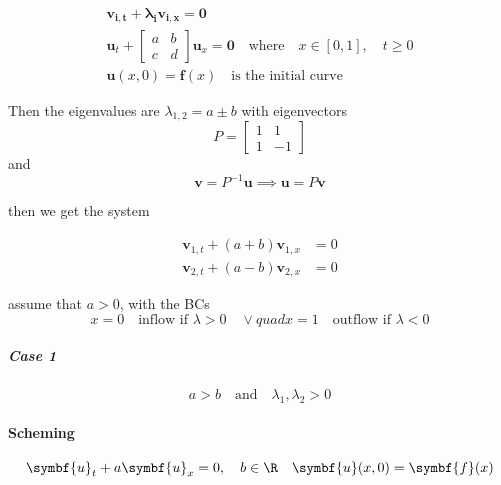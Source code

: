 \begin{example}{}{}
  \begin{align*}
    \symbf{v_{i,t} + \lambda_i v_{i,x} = 0}                                     \\
    \symbf{u}_t +
    \begin{bmatrix}
      a & b \\
      c & d
    \end{bmatrix}
    \symbf{u}_x = \symbf{0} \quad \text{where} \quad x\in [0,1], \quad t \geq 0 \\
    \symbf{u}(x,0) = \symbf{f}(x) \quad \text{is the initial curve}
  \end{align*}

  Then the eigenvalues are \(\lambda_{1,2} = a \pm b\) with eigenvectors
  \[
    P = \begin{bmatrix}
      1 & 1  \\
      1 & -1
    \end{bmatrix}
  \]
  and
  \[
    \symbf{v} = P^{-1}\symbf{u} \implies \symbf{u} = P\symbf{v}
  \]

  then we get the system

  \begin{align*}
    \symbf{v}_{1,t} + (a + b)\symbf{v}_{1,x} & = 0 \\
    \symbf{v}_{2,t} + (a - b)\symbf{v}_{2,x} & = 0
  \end{align*}

  assume that \(a > 0\), with the BCs
  \[
    x=0 \quad \text{inflow if } \lambda > 0 \quad \vee quad x = 1 \quad \text{outflow if } \lambda < 0
  \]

  \subparagraph{Case 1}
  \[
    a > b \quad \text{and} \quad \lambda_1, \lambda_2 > 0
  \]



\end{example}


\paragraph{Scheming}
\[
  \symbf{u}_t + a \symbf{u}_x = 0 , \quad b \in \R \quad \symbf{u}(x,0) = \symbf{f}(x)
\]

